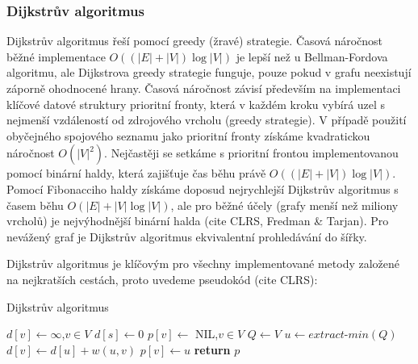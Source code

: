 \documentclass[12pt,titlepage]{report}
\begin{document}
\subsubsection{Dijkstrův algoritmus}
Dijkstrův algoritmus řeší  pomocí greedy
(žravé) strategie. Časová náročnost běžné implementace $O((|E| + |V|)\log|V|)$
je lepší než u Bellman-Fordova algoritmu, ale Dijkstrova greedy strategie
funguje, pouze pokud v grafu neexistují záporně ohodnocené hrany. Časová
náročnost závisí především na implementaci klíčové datové struktury prioritní
fronty, která v každém kroku vybírá uzel s nejmenší vzdáleností od zdrojového
vrcholu (greedy strategie). V případě použití obyčejného spojového seznamu jako
prioritní fronty získáme kvadratickou náročnost $O(|V|^2)$. Nejčastěji se
setkáme s prioritní frontou implementovanou pomocí binární haldy, která
zajišťuje čas běhu právě $O((|E| + |V|)\log|V|)$. Pomocí Fibonacciho haldy
získáme doposud nejrychlejší Dijkstrův algoritmus s časem běhu $O(|E| + |V|
\log|V|)$, ale pro běžné účely (grafy menší než miliony vrcholů) je
nejvýhodnější binární halda (cite CLRS, Fredman \& Tarjan). Pro nevážený graf
je Dijkstrův algoritmus ekvivalentní prohledávání do šířky.

Dijkstrův algoritmus je klíčovým pro všechny implementované metody založené na
nejkratších cestách, proto uvedeme pseudokód (cite CLRS):

\begin{center}
\begin{minipage}{\textwidth}
\begin{algorithm}[H]
	\caption{Dijkstrův algoritmus}
		\label{alg:dijkstra}
	\begin{algorithmic}[1]
	\Statex
	  
		\State $d[v] \gets \infty$,$v \in V$
		\State $d[s] \gets 0$
		\State $p[v] \gets $ NIL,$v \in V$
		\State $Q \gets V$
			\State $u \gets extract\mbox{-}min(Q)$
					\State $d[v] \gets d[u] + w(u, v)$
					\State $p[v] \gets u$
				\EndIf
			\EndFor
		\EndWhile
		\State \textbf{return} $p$
	\EndFunction
	\end{algorithmic}
\end{algorithm}
\end{minipage}
\end{center}
\mbox{}
\end{document}
